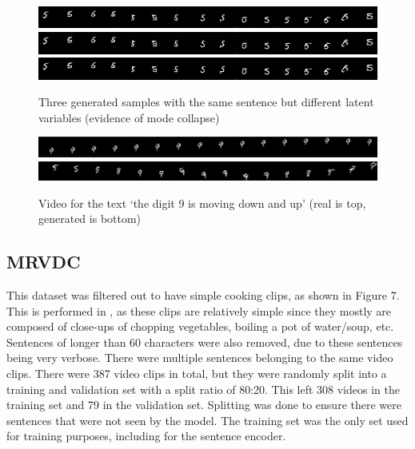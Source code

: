 \documentclass{article}
\begin{document}
{{\begin{figure}[H] \label{fig:modecollapse}
    \centering
    \includegraphics[width=0.8\linewidth]{imgs/mnist/mode_collapse.png}\\
    \includegraphics[width=0.8\linewidth]{imgs/mnist/mode_collapse2.png}
    \includegraphics[width=0.8\linewidth]{imgs/mnist/mode_collapse3.png}
    \caption{Three generated samples with the same sentence but different latent variables (evidence of mode collapse)}
\end{figure}

\begin{figure}[H]
    \centering
    \includegraphics[width=0.8\linewidth]{imgs/mnist/minst_9_true.png}\\
    \includegraphics[width=0.8\linewidth]{imgs/mnist/minst_fake_9.png}
    \caption{Video for the text `the digit 9 is moving down and up' (real is top, generated is bottom)}
\end{figure}

\subsection{MRVDC}

This dataset was filtered out to have simple cooking clips, as shown in
Figure 7. This is performed in \cite{pan_create_2018}, as these clips are
relatively simple since they mostly are composed of close-ups of chopping
vegetables, boiling a pot of water/soup, etc. Sentences of longer than 60
characters were also removed, due to these sentences being very verbose. There were multiple sentences belonging
to the same video clips. There were 387 video clips in total, but they were
randomly split into a training and validation set with a split ratio of 80:20.
This left 308 videos in the training set and 79 in the validation set.
Splitting was done to ensure there were sentences that were not seen by the
model. The training set was the only set used for training purposes, including for the sentence encoder.

}}
\end{document}
